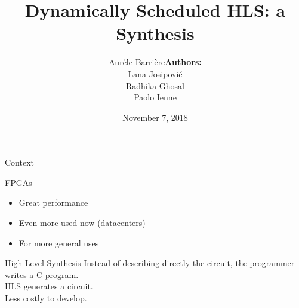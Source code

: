 \documentclass[page number]{beamer}
\def\outline{
  \begin{frame}[plain,noframenumbering]
    \frametitle{Outline}
    \tableofcontents[currentsection]
  \end{frame}
}
\begin{document}
\title{Dynamically Scheduled HLS: a Synthesis}

\author[Aur\`ele Barri\`ere]{Aur\`ele Barri\`ere\hfill\textbf{Authors:}\begin{tabular}{c}
    Lana Josipovi\'c\\
    Radhika Ghosal\\
    Paolo Ienne\\
  \end{tabular}}

\date{November 7, 2018}

\def\outline{
  \begin{frame}[plain,noframenumbering]
    \frametitle{Outline}
    \tableofcontents[currentsection]
  \end{frame}
}

\begin{frame}
  \vspace{-2cm}
  \maketitle
  \vspace{-4cm}
\end{frame}


\def\g#1{{\textbf{\color{mDarkGreen}#1}}}
\def\r#1{{\textbf{\color{mDarkRed}#1}}}
\begin{frame}{Context}
  \begin{block}{FPGAs}
    \begin{itemize}
      \item Great performance
      \item Even more used now (datacenters)
      \item For more general uses
    \end{itemize}
  \end{block}
  \vfill
  \begin{block}{High Level Synthesis}
    Instead of describing directly the circuit, the programmer writes a C program.\\
    HLS generates a circuit.\\
    Less costly to develop.
  \end{block}
\end{frame}
\end{document}
